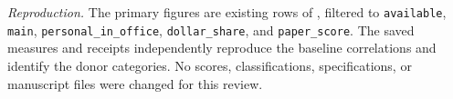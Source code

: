 \textit{Reproduction.} The primary figures are existing rows of
,
filtered to \texttt{available}, \texttt{main}, \texttt{personal\_in\_office},
\texttt{dollar\_share}, and \texttt{paper\_score}. The saved measures and receipts
independently reproduce the baseline correlations and identify the donor
categories. No scores, classifications, specifications, or manuscript files
were changed for this review.
